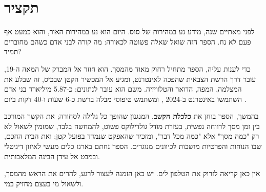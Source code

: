 \chapter*{תקציר}

לפני מאתיים שנה, מידע נע במהירות של סוס. היום הוא נע במהירות האור, והוא כמעט אף פעם לא נח. הספר הזה שואל שאלה פשוטה לכאורה: מה קורה לבני אדם כשהם מחוברים תמיד?

כדי לענות עליה, הספר מתחיל רחוק מאוד מהמסך. הוא חוזר אל המברק של המאה ה-19, עובר דרך הרשת הצבאית שהפכה לאינטרנט, ומגיע אל המכשיר הקטן שבכיס, זה שבלע את המצלמה, המפה, הדואר והטלוויזיה. משם הוא עובר לנתונים: כ-5.87 מיליארד בני אדם השתמשו באינטרנט ב-2024 \parencite{itu2026data}, ומשתמש טיפוסי מבלה ברשת כ-6 שעות ו-40 דקות ביום \parencite{kemp2024}.

בהמשך, הספר בוחן את \textbf{כלכלת הקשב}, המנגנון שהופך כל גלילה לסחורה; את הקשר המורכב בין זמן מסך לרווחה נפשית, בעזרת מודל גולדילוקס פשוט, להמחשה בלבד, שמזמין לשאול לא רק "כמה מסך" אלא "כמה מכל דבר", ומזכיר שהאפקט שנמדד בפועל קטן; ואת הבית החכם, שבו הנוחות והפרטיות מושכות לכיוונים מנוגדים. הספר נחתם בארגז כלים מעשי לאיזון דיגיטלי ובמבט אל עידן הבינה המלאכותית.

אין כאן קריאה לזרוק את הטלפון לים. יש כאן הזמנה לעצור לרגע, להרים את הראש מהמסך, ולשאול מי בעצם מחזיק במי.

